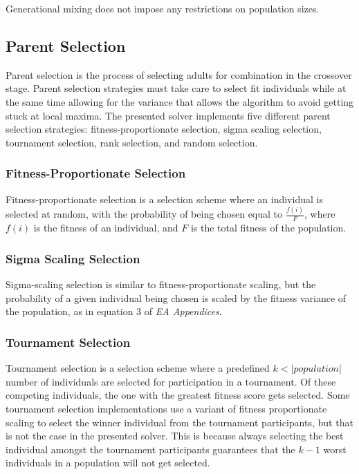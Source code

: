 \documentclass[twocolumn,oneside]{amsart}
\begin{document}
Generational mixing does not impose any restrictions on population sizes.

\subsection{Parent Selection}
Parent selection is the process of selecting adults for combination in the crossover stage.
Parent selection strategies must take care to select fit individuals while at the same time allowing for the variance that allows the algorithm to avoid getting stuck at local maxima.
The presented solver implements five different parent selection strategies: fitness-proportionate selection, sigma scaling selection, tournament selection, rank selection, and random selection.

\subsubsection{Fitness-Proportionate Selection}
Fitness-proportionate selection is a selection scheme where an individual is selected at random, with the probability of being chosen equal to $ \frac{f(i)}{F} $, where $ f(i) $ is the fitness of an individual, and $ F $ is the total fitness of the population.

\subsubsection{Sigma Scaling Selection}
Sigma-scaling selection is similar to fitness-proportionate scaling, but the probability of a given individual being chosen is scaled by the fitness variance of the population, as in equation 3 of \textit{EA Appendices}.

\subsubsection{Tournament Selection}

Tournament selection is a selection scheme where a predefined $ k < | population | $ number of individuals are selected for participation in a tournament.
Of these competing individuals, the one with the greatest fitness score gets selected.
Some tournament selection implementations use a variant of fitness proportionate scaling to select the winner individual from the tournament participants, but that is not the case in the presented solver.
This is because always selecting the best individual amongst the tournament participants guarantees that the $ k - 1 $ worst individuals in a population will not get selected.
\end{document}
